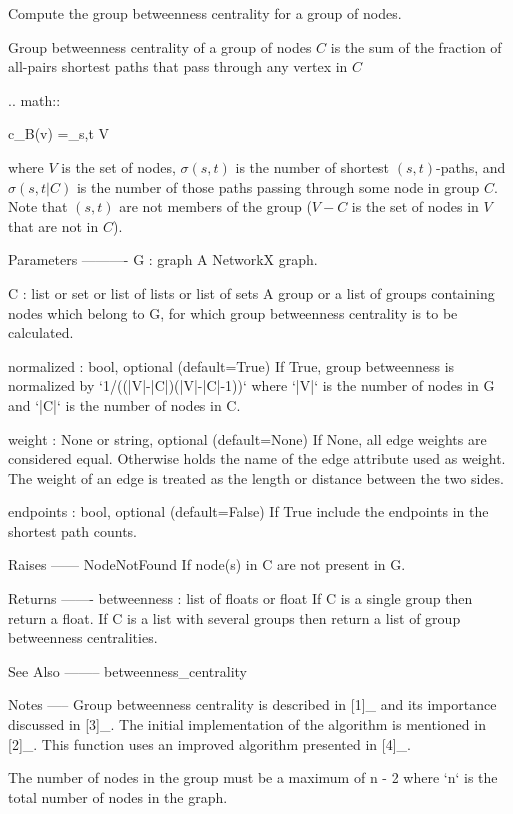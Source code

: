 \begin{DoxyVerb}Compute the group betweenness centrality for a group of nodes.

Group betweenness centrality of a group of nodes $C$ is the sum of the
fraction of all-pairs shortest paths that pass through any vertex in $C$

.. math::

   c_B(v) =\sum_{s,t \in V} 

where $V$ is the set of nodes, $\sigma(s, t)$ is the number of
shortest $(s, t)$-paths, and $\sigma(s, t|C)$ is the number of
those paths passing through some node in group $C$. Note that
$(s, t)$ are not members of the group ($V-C$ is the set of nodes
in $V$ that are not in $C$).

Parameters
----------
G : graph
  A NetworkX graph.

C : list or set or list of lists or list of sets
  A group or a list of groups containing nodes which belong to G, for which group betweenness
  centrality is to be calculated.

normalized : bool, optional (default=True)
  If True, group betweenness is normalized by `1/((|V|-|C|)(|V|-|C|-1))`
  where `|V|` is the number of nodes in G and `|C|` is the number of nodes in C.

weight : None or string, optional (default=None)
  If None, all edge weights are considered equal.
  Otherwise holds the name of the edge attribute used as weight.
  The weight of an edge is treated as the length or distance between the two sides.

endpoints : bool, optional (default=False)
  If True include the endpoints in the shortest path counts.

Raises
------
NodeNotFound
   If node(s) in C are not present in G.

Returns
-------
betweenness : list of floats or float
   If C is a single group then return a float. If C is a list with
   several groups then return a list of group betweenness centralities.

See Also
--------
betweenness_centrality

Notes
-----
Group betweenness centrality is described in [1]_ and its importance discussed in [3]_.
The initial implementation of the algorithm is mentioned in [2]_. This function uses
an improved algorithm presented in [4]_.

The number of nodes in the group must be a maximum of n - 2 where `n`
is the total number of nodes in the graph.


\end{DoxyVerb}
